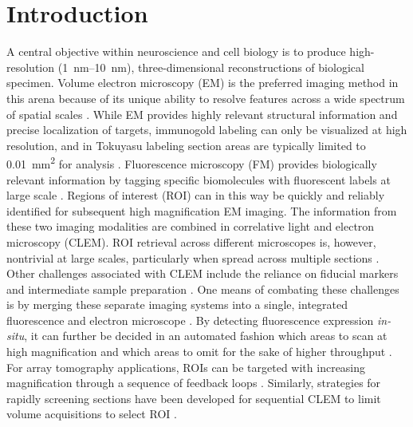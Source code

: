 \section{Introduction}
\label{sec:3.1_intro}


A central objective within neuroscience and cell biology is to produce high-resolution (\SIrange{1}{10}{\nano\meter}), three-dimensional reconstructions of biological specimen. Volume electron microscopy (EM) is the preferred imaging method in this arena because of its unique ability to resolve features across a wide spectrum of spatial scales \cite{peddie2014exploring, kornfeld2018progress}. While EM provides highly relevant structural information and precise localization of targets, immunogold labeling can only be visualized at high resolution, and in Tokuyasu labeling section areas are typically limited to \SI{0.01}{\milli\meter^2} for analysis \cite{liou1996improving, van2008correlative}. Fluorescence microscopy (FM) provides biologically relevant information by tagging specific biomolecules with fluorescent labels at large scale \cite{giepmans2006fluorescent}. Regions of interest (ROI) can in this way be quickly and reliably identified for subsequent high magnification EM imaging. The information from these two imaging modalities are combined in correlative light and electron microscopy (CLEM). ROI retrieval across different microscopes is, however, nontrivial at large scales, particularly when spread across multiple sections \cite{polishchuk2000correlative, bishop2011near, karreman2014correlating, collinson2017correlating, booth2019superclem}. Other challenges associated with CLEM include the reliance on fiducial markers and intermediate sample preparation \cite{de2015correlated, karreman2016intravital}. One means of combating these challenges is by merging these separate imaging systems into a single, integrated fluorescence and electron microscope \cite{liv2013simultaneous}. By detecting fluorescence expression \textit{in-situ}, it can further be decided in an automated fashion which areas to scan at high magnification and which areas to omit for the sake of higher throughput \cite{delpiano2018automated}. For array tomography applications, ROIs can be targeted with increasing magnification through a sequence of feedback loops \cite{gabarre2021workflow}. Similarly, strategies for rapidly screening sections have been developed for sequential CLEM to limit volume acquisitions to select ROI \cite{burel2018targeted, ronchi2021high}.

